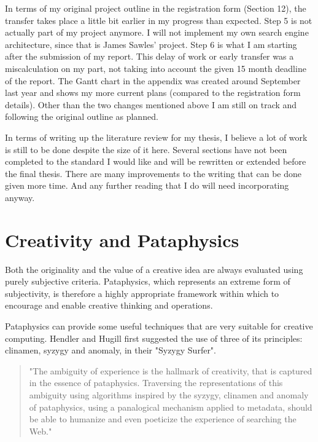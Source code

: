 In terms of my original project outline in the registration form (Section 12), the transfer takes place a little bit earlier in my progress than expected. Step 5 is not actually part of my project anymore. I will not implement my own search engine architecture, since that is James Sawles' project. Step 6 is what I am starting after the submission of my report. This delay of work or early transfer was a miscalculation on my part, not taking into account the given 15 month deadline of the report. The Gantt chart in the appendix was created around September last year and shows my more current plans (compared to the registration form details). Other than the two changes mentioned above I am still on track and following the original outline as planned.

In terms of writing up the literature review for my thesis, I believe a lot of work is still to be done despite the size of it here. Several sections have not been completed to the standard I would like and will be rewritten or extended before the final thesis. There are many improvements to the writing that can be done given more time.  And any further reading that I do will need incorporating anyway.

\section{Creativity and Pataphysics}

Both the originality and the value of a creative idea are always evaluated using purely subjective criteria. Pataphysics, which represents an extreme form of subjectivity, is therefore a highly appropriate framework within which to encourage and enable creative thinking and operations.

Pataphysics can provide some useful techniques that are very suitable for creative computing. Hendler and Hugill first suggested the use of three of its principles: clinamen, syzygy and anomaly, in their "Syzygy Surfer".

\begin{quote}
  "The ambiguity of experience is the hallmark of creativity, that is captured in the essence of pataphysics. Traversing the representations of this ambiguity using algorithms inspired by the syzygy, clinamen and anomaly of pataphysics, using a panalogical mechanism applied to metadata, should be able to humanize and even poeticize the experience of searching the Web." \citep{Hendler2013}
\end{quote}

